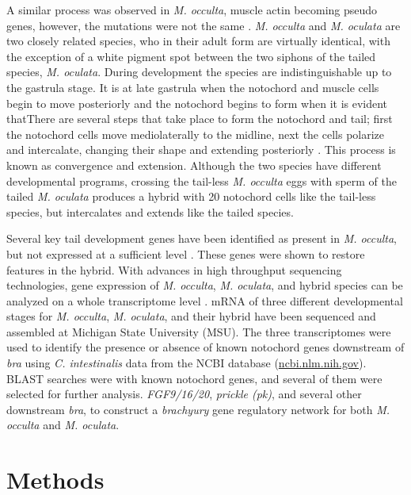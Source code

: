 A similar process was observed in \textit{M. occulta}, muscle actin becoming pseudo genes, however, the mutations were not the same \cite{jeffery_evolution_1999}. \textit{M. occulta} and \textit{M. oculata} are two closely related species, who in their adult form are virtually identical, with the exception of a white pigment spot between the two siphons of the tailed species, \textit{M. oculata}. During development the species are indistinguishable up to the gastrula stage. It is at late gastrula when the notochord and muscle cells begin to move posteriorly \cite{swalla_novel_1993} and the notochord begins to form when it is evident thatThere are several steps that take place to form the notochord and tail; first the notochord cells move mediolaterally to the midline, next the cells polarize and intercalate, changing their shape and extending posteriorly \cite{keller_mechanisms_2000, jiang_ascidian_2005,stemple_structure_2005}. This process is known as convergence and extension. Although the two species have different developmental programs, crossing the tail-less \textit{M. occulta} eggs with sperm of the tailed \textit{M. oculata} produces a hybrid with 20 notochord cells like the tail-less species, but intercalates and extends like the tailed species.  

Several key tail development genes have been identified as present in \textit{M. occulta}, but not expressed at a sufficient level \cite{swalla_interspecific_1990,jeffery_factors_1992,swalla_novel_1993}. These genes were shown to restore features in the hybrid. With advances in high throughput sequencing technologies, gene expression of \textit{M. occulta}, \textit{M. oculata}, and hybrid species can be analyzed on a whole transcriptome level \cite{gyoja_analysis_2007,pickrell_variation_2010}. mRNA of three different developmental stages for \textit{M. occulta}, \textit{M. oculata}, and their hybrid have been sequenced and assembled at Michigan State University (MSU). The three transcriptomes were used to identify the presence or absence of known notochord genes downstream of \textit{bra} using \textit{C. intestinalis} data from the NCBI database (\url{ncbi.nlm.nih.gov}). BLAST searches were with known notochord genes, and several of them were selected for further analysis. \textit{FGF9/16/20}, \textit{prickle (pk)}, and several other downstream \textit{bra}, to construct a \textit{brachyury} gene regulatory network for both \textit{M. occulta} and \textit{M. oculata}. 

\section{Methods}
